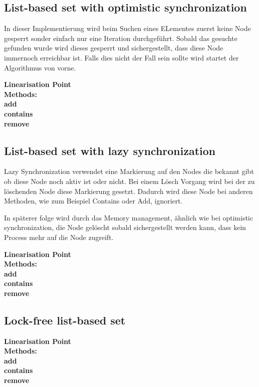 \subsection{List-based set with optimistic synchronization}

In dieser Implementierung wird beim Suchen eines ELementes zuerst keine Node gesperrt sonder einfach nur eine Iteration durchgeführt. Sobald das gesuchte gefunden wurde wird dieses gesperrt und sichergestellt, dass diese Node immernoch erreichbar ist. Falls dies nicht der Fall sein sollte wird startet der Algorithmus von vorne.

\textbf{Linearisation Point}\\
\textbf{Methods:}\\
\textbf{add}\\
\textbf{contains}\\
\textbf{remove}

\subsection{List-based set with lazy synchronization}

Lazy Synchronization verwendet eine Markierung auf den Nodes die bekannt gibt ob diese Node noch aktiv ist oder nicht. Bei einem Lösch Vorgang wird bei der zu löschenden Node diese Markierung gesetzt. Dadurch wird diese Node bei anderen Methoden, wie zum Beispiel Contains oder Add, ignoriert. 

In späterer folge wird durch das Memory management, ähnlich wie bei optimistic synchronization, die Node gelöscht sobald sichergestellt werden kann, dass kein Process mehr auf die Node zugreift.

\textbf{Linearisation Point}\\
\textbf{Methods:}\\
\textbf{add}\\
\textbf{contains}\\
\textbf{remove}

\subsection{Lock-free list-based set}

\textbf{Linearisation Point}\\
\textbf{Methods:}\\
\textbf{add}\\
\textbf{contains}\\
\textbf{remove}